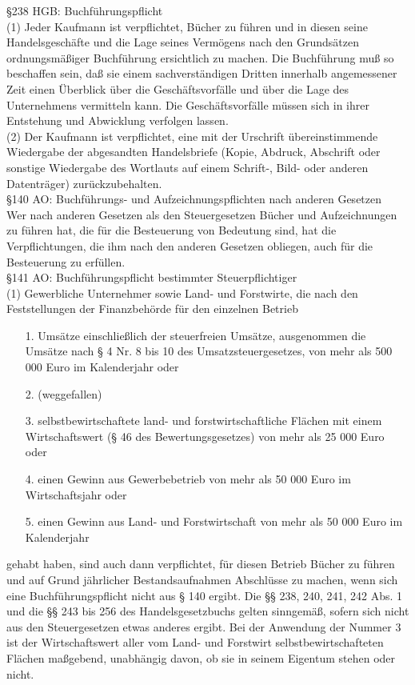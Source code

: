 \documentclass{article}
\begin{document}
\S238 HGB: Buchführungspflicht\\
(1) Jeder Kaufmann ist verpflichtet, Bücher zu führen und in diesen seine Handelsgeschäfte und die Lage seines Vermögens nach den Grundsätzen ordnungsmäßiger Buchführung ersichtlich zu machen. Die Buchführung muß so beschaffen sein, daß sie einem sachverständigen Dritten innerhalb angemessener Zeit einen Überblick über die Geschäftsvorfälle und über die Lage des Unternehmens vermitteln kann. Die Geschäftsvorfälle müssen sich in ihrer Entstehung und Abwicklung verfolgen lassen.\\
(2) Der Kaufmann ist verpflichtet, eine mit der Urschrift übereinstimmende Wiedergabe der abgesandten Handelsbriefe (Kopie, Abdruck, Abschrift oder sonstige Wiedergabe des Wortlauts auf einem Schrift-, Bild- oder anderen Datenträger) zurückzubehalten.\\
\S140 AO: Buchführungs- und Aufzeichnungspflichten nach anderen Gesetzen\\
Wer nach anderen Gesetzen als den Steuergesetzen Bücher und Aufzeichnungen zu führen hat, die für die Besteuerung von Bedeutung sind, hat die Verpflichtungen, die ihm nach den anderen Gesetzen obliegen, auch für die Besteuerung zu erfüllen.\\
\S141 AO: Buchführungspflicht bestimmter Steuerpflichtiger\\
(1) Gewerbliche Unternehmer sowie Land- und Forstwirte, die nach den Feststellungen der Finanzbehörde für den einzelnen Betrieb
\begin{enumerate}
	\item[1.]Umsätze einschließlich der steuerfreien Umsätze, ausgenommen die Umsätze nach § 4 Nr. 8 bis 10 des Umsatzsteuergesetzes, von mehr als 500 000 Euro im Kalenderjahr oder
	\item[2.](weggefallen)
	\item[3.]selbstbewirtschaftete land- und forstwirtschaftliche Flächen mit einem Wirtschaftswert (§ 46 des Bewertungsgesetzes) von mehr als 25 000 Euro oder
	\item[4.]einen Gewinn aus Gewerbebetrieb von mehr als 50 000 Euro im Wirtschaftsjahr oder
	\item[5.]einen Gewinn aus Land- und Forstwirtschaft von mehr als 50 000 Euro im Kalenderjahr
\end{enumerate}
gehabt haben, sind auch dann verpflichtet, für diesen Betrieb Bücher zu führen und auf Grund jährlicher Bestandsaufnahmen Abschlüsse zu machen, wenn sich eine Buchführungspflicht nicht aus § 140 ergibt. Die §§ 238, 240, 241, 242 Abs. 1 und die §§ 243 bis 256 des Handelsgesetzbuchs gelten sinngemäß, sofern sich nicht aus den Steuergesetzen etwas anderes ergibt. Bei der Anwendung der Nummer 3 ist der Wirtschaftswert aller vom Land- und Forstwirt selbstbewirtschafteten Flächen maßgebend, unabhängig davon, ob sie in seinem Eigentum stehen oder nicht.
\end{document}
